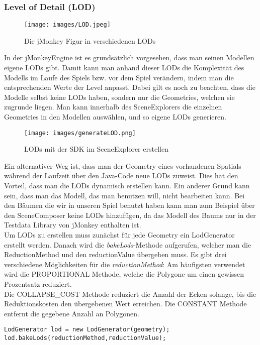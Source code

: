 \subsubsection{Level of Detail (LOD)}
\begin{figure}[h!]
	
	
	
	\centering\texttt{[image: images/LOD.jpeg]}
	\caption{Die jMonkey Figur in verschiedenen LODs}
	
\end{figure}  
In der jMonkeyEngine ist es grundsätzlich vorgesehen, dass man seinen Modellen eigene LODs gibt. Damit kann man anhand dieser LODs die Komplexität des Modells im Laufe des Spiels bzw. vor dem Spiel verändern, indem man die entsprechenden Werte der Level anpasst. Dabei gilt es noch zu beachten, dass die Modelle selbst keine LODs haben, sondern nur die Geometries, welchen sie zugrunde liegen. Man kann innerhalb des SceneExplorers die einzelnen Geometries in den Modellen auswählen, und so eigene LODs generieren.\\
\begin{figure}[H]
	
	
	\centering\texttt{[image: images/generateLOD.png]}
	\caption{LODs mit der SDK im SceneExplorer erstellen}
	
\end{figure} 
Ein alternativer Weg ist, dass man der Geometry eines vorhandenen Spatials während der Laufzeit über den Java-Code neue LODs zuweist. Dies hat den Vorteil, dass man die LODs dynamisch erstellen kann. Ein anderer Grund kann sein, dass man das Modell, das man benutzen will, nicht bearbeiten kann. Bei den Bäumen die wir in unseren Spiel benutzt haben kann man zum Beispiel über den SceneComposer keine LODs hinzufügen, da das Modell des Baums nur in der Testdata Library von jMonkey enthalten ist. \\
Um LODs zu erstellen muss zunächst für jede Geometry ein LodGenerator erstellt werden. Danach wird die \emph{bakeLods}-Methode aufgerufen, welcher man die ReductionMethod und den reductionValue übergeben muss. Es gibt drei verschiedene Möglichkeiten für die \emph{reductionMethod}: Am häufigsten verwendet wird die PROPORTIONAL Methode, welche die Polygone um einen gewissen Prozentsatz reduziert. \\
Die COLLAPSE\_COST Methode reduziert die Anzahl der Ecken solange, bis die Reduktionskosten den übergebenen Wert erreichen. Die CONSTANT Methode entfernt die gegebene Anzahl an Polygonen.
\begin{lstlisting}
LodGenerator lod = new LodGenerator(geometry);
lod.bakeLods(reductionMethod,reductionValue);
\end{lstlisting}

